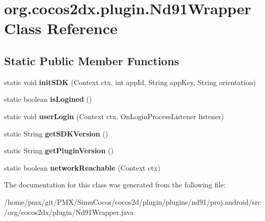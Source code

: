 \hypertarget{classorg_1_1cocos2dx_1_1plugin_1_1Nd91Wrapper}{}\section{org.\+cocos2dx.\+plugin.\+Nd91\+Wrapper Class Reference}
\label{classorg_1_1cocos2dx_1_1plugin_1_1Nd91Wrapper}
\subsection*{Static Public Member Functions}
\begin{DoxyCompactItemize}
\item 
\mbox{\label{classorg_1_1cocos2dx_1_1plugin_1_1Nd91Wrapper_ab78f8d7ed85d85ab788eb2e479ce43ee}} 
static void {\bfseries init\+S\+DK} (Context ctx, int app\+Id, String app\+Key, String orientation)
\item 
\mbox{\label{classorg_1_1cocos2dx_1_1plugin_1_1Nd91Wrapper_ae1db5e5b0186c2e39773331c866398c3}} 
static boolean {\bfseries is\+Logined} ()
\item 
\mbox{\label{classorg_1_1cocos2dx_1_1plugin_1_1Nd91Wrapper_a4cc64255ff998d76a09225efe1458eb7}} 
static void {\bfseries user\+Login} (Context ctx, On\+Login\+Process\+Listener listener)
\item 
\mbox{\label{classorg_1_1cocos2dx_1_1plugin_1_1Nd91Wrapper_ab8a4d245f9a9e9e8ba7dfc7fcca60771}} 
static String {\bfseries get\+S\+D\+K\+Version} ()
\item 
\mbox{\label{classorg_1_1cocos2dx_1_1plugin_1_1Nd91Wrapper_af629744d90cb81f694bfb00c48f5b72c}} 
static String {\bfseries get\+Plugin\+Version} ()
\item 
\mbox{\label{classorg_1_1cocos2dx_1_1plugin_1_1Nd91Wrapper_af64d1b84621f8b5fc3d144977e52e488}} 
static boolean {\bfseries network\+Reachable} (Context ctx)
\end{DoxyCompactItemize}


The documentation for this class was generated from the following file\+:\begin{DoxyCompactItemize}
\item 
/home/pmx/git/\+P\+M\+X/\+Simu\+Cocos/cocos2d/plugin/plugins/nd91/proj.\+android/src/org/cocos2dx/plugin/Nd91\+Wrapper.\+java\end{DoxyCompactItemize}
